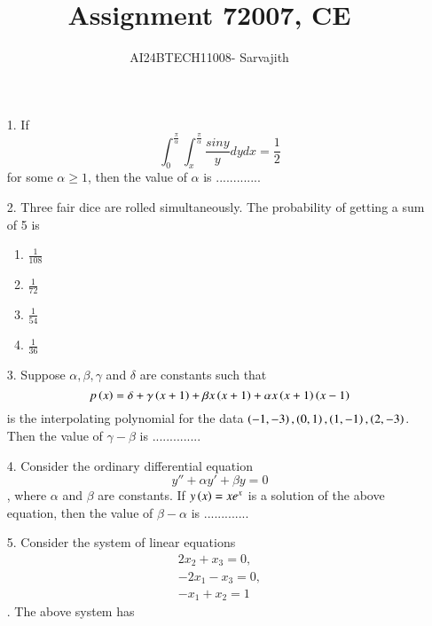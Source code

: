 \documentclass[journal]{IEEEtran}
\begin{document}

\vspace{3cm}


\author{AI24BTECH11008- Sarvajith
}
\title{Assignment 7}
{\let\newpage\relax\maketitle}
\title{2007, CE}
\renewcommand{\thefigure}{\theenumi}
\renewcommand{\thetable}{\theenumi}
\setlength{\intextsep}{10pt} %
\renewcommand{\thetable}{\theenumi}
\begin{enumerate}
    \item[1.] If $$\int_{0}^{\frac{\pi}{\alpha}}\int_{x}^{\frac{\pi}{\alpha}}\frac{siny}{y}dydx = \frac{1}{2}$$ for some $\alpha \geq 1$, then the value of $\alpha$ is .............
    \item[2.] Three fair dice are rolled simultaneously. The probability of getting a sum of 5 is 
    \begin{enumerate}[label = (\Alph*)]
        \item $\frac{1}{108}$
        \item $\frac{1}{72}$
        \item $\frac{1}{54}$
        \item $\frac{1}{36}$
    \end{enumerate} 
    \item[3.] Suppose $\alpha, \beta, \gamma$ and $\delta$ are constants such that $$p\left(x\right) = \delta + \gamma\left(x+1\right)+\beta x\left(x+1\right) + \alpha x\left(x+1\right)\left(x-1\right)$$ is the interpolating polynomial for the data $\left(-1,-3\right),\left(0,1\right),\left(1,-1\right),\left(2,-3\right)$. Then the value of $\gamma - \beta$ is ..............
    \item[4.] Consider the ordinary differential equation $$y'' + \alpha y' + \beta y =0$$, where $\alpha$ and $\beta$ are constants. If $y\left(x\right) = xe^x$ is a solution of the above equation, then the value of $\beta-\alpha$ is .............
    \item[5.] Consider the system of linear equations \begin{align*}2x_2 + x_3 =0,\\-2x_1 - x_3=0,\\-x_1 + x_2=1\end{align*}. The above system has 

\end{enumerate}
\end{document}
